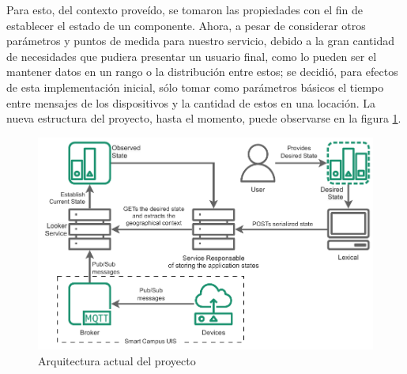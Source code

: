 Para esto, del contexto proveído, se tomaron las propiedades con el fin de establecer el estado de un componente. Ahora, a pesar de considerar otros parámetros y puntos de medida para nuestro servicio, debido a la gran cantidad de necesidades que pudiera presentar un usuario final, como lo pueden ser el mantener datos en un rango o la distribución entre estos; se decidió, para efectos de esta implementación inicial, sólo tomar como parámetros básicos el tiempo entre mensajes de los dispositivos y la cantidad de estos en una locación. La nueva estructura del proyecto, hasta el momento, puede observarse en la figura \ref{fig:StarDuckBasic}.
 

\begin{figure}[ht]
    \centering
    \caption{Arquitectura actual del proyecto}
    \label{fig:StarDuckBasic}
    \includegraphics[width=\linewidth]{images/StarDuckBasic.pdf}
\end{figure}


